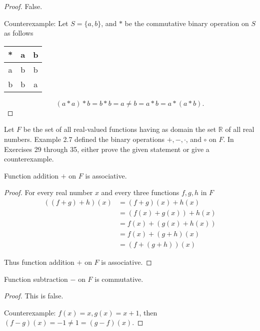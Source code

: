 \begin{proof}
    False.

    Counterexample: Let $S = \{ a, b \}$, and $*$ be the commutative binary operation on $S$ as follows
    \begin{tabular}{c|cc}
        * & a & b \\
        \midrule
        a & b & b \\
        b & b & a
    \end{tabular}

    \[
        (a * a) * b = b * b = a \ne b = a * b = a * (a * b).
    \]
\end{proof}

Let $F$ be the set of all real-valued functions having as domain the set $\mathbb{R}$ of all real numbers. Example 2.7 defined the binary operations $+, -, \cdot$, and $\circ$ on $F$. In Exercises 29 through 35, either prove the given statement or give a
counterexample.

\newpage
\begin{exercise}
    Function addition $+$ on $F$ is associative.
\end{exercise}

\begin{proof}
    For every real number $x$ and every three functions $f, g, h$ in $F$
    \begin{align*}
        ((f + g) + h)(x) & = (f + g)(x) + h(x)    \\
                         & = (f(x) + g(x)) + h(x) \\
                         & = f(x) + (g(x) + h(x)) \\
                         & = f(x) + (g + h)(x)    \\
                         & = (f + (g + h))(x)
    \end{align*}

    Thus function addition $+$ on $F$ is associative.
\end{proof}

\newpage
\begin{exercise}
    Function subtraction $-$ on $F$ is commutative.
\end{exercise}

\begin{proof}
    This is false.

    Counterexample: $f(x) = x, g(x) = x + 1$, then $(f - g)(x) = -1\ne 1 = (g - f)(x)$.
\end{proof}

